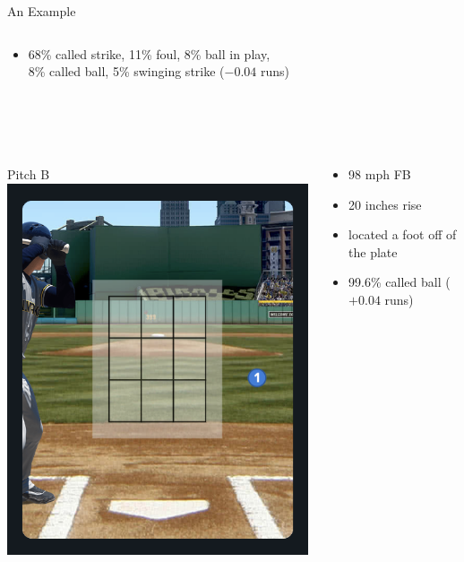 \documentclass{beamer}
\begin{document}
\begin{frame}{An Example}
\begin{columns}
\begin{column}{0.8\textwidth}
\begin{itemize}
          \item 68\% called strike, 11\% foul, 8\% ball in play,\\
            8\% called ball, 5\% swinging strike ($-0.04$ runs)
        \end{itemize}
      \end{column}
    \end{columns}
    ~\\
    ~\\
    \begin{columns}
      \begin{column}{0.2\textwidth}
        \centering
        Pitch B\\
        \includegraphics[width = \textwidth]{images/pitch_outside}
      \end{column}
      \begin{column}{0.8\textwidth}
        \begin{itemize}
          \item 98 mph FB
          \item 20 inches rise
          \item located a foot off of the plate
          \item 99.6\% called ball ($+0.04$ runs)
        \end{itemize}
      \end{column}
    \end{columns}
  \end{frame}
\end{document}
